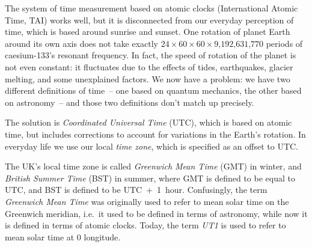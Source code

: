 The system of time measurement based on atomic clocks (International Atomic Time, TAI) works well, but it is disconnected from our everyday perception of time, which is based around sunrise and sunset.
One rotation of planet Earth around its own axis does not take exactly $24 \times 60 \times 60 \times \text{9,192,631,770}$ periods of caesium-133's resonant frequency.
In fact, the speed of rotation of the planet is not even constant: it fluctuates due to the effects of tides, earthquakes, glacier melting, and some unexplained factors.
We now have a problem: we have two different definitions of time~-- one based on quantum mechanics, the other based on astronomy~-- and those two definitions don't match up precisely.

The solution is \emph{Coordinated Universal Time} (UTC), which is based on atomic time, but includes corrections to account for variations in the Earth's rotation.
In everyday life we use our local \emph{time zone}, which is specified as an offset to UTC.

The UK's local time zone is called \emph{Greenwich Mean Time} (GMT) in winter, and \emph{British Summer Time} (BST) in summer, where GMT is defined to be equal to UTC, and BST is defined to be UTC~+~1~hour.
Confusingly, the term \emph{Greenwich Mean Time} was originally used to refer to mean solar time on the Greenwich meridian, i.e.\ it used to be defined in terms of astronomy, while now it is defined in terms of atomic clocks.
Today, the term \emph{UT1} is used to refer to mean solar time at 0{\textdegree} longitude.

